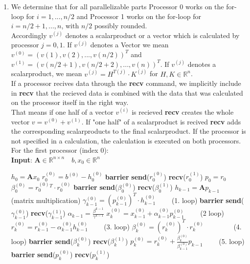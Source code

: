 \documentclass{article}
\begin{document}
\begin{enumerate}[label=(\alph*)]
\item
We determine that for all parallelizable parts Processor 0 works on the for-loop for $i = 1,...,n/2$ and Processor 1 works on the for-loop for $i = n/2+1,...,n$, with $n/2$ possibly rounded.\\
Accordingly $v^{(j)}$ denotes a scalarproduct or a vector which is calculated by processor $j = 0, 1$. 
If $v^{(j)}$ denotes a Vector we mean $v^{(0)} = (v(1), v(2), ..., v(n/2))^T$ and $v^{(1)} = (v(n/2+1), v(n/2+2), ..., v(n))^T$.
If $v^{(j)}$ denotes a scalarproduct, we mean $v^{(j)} = H^{T(j)} \cdot K^{(j)}$ for $H, K \in \mathbb{R}^n$.\\
If a processor recives data through the \textbf{recv} command, we implicitly include in \textbf{recv} that the recieved data is combined with the data that was calculated on the processor itself in the right way. \\
That means if one half of a vector $v^{(i)}$ is recieved \textbf{recv} creates the whole vector $v=v^{(0)}+v^{(1)}$. If "one half" of a scalarproduct is recived \textbf{recv} adds the corresponding scalarproducts to the final scalarproduct.
If the processor is not specified in a calculation, the calculation is executed on both processors.
\\
For the first processor (index 0):
\\
   \textbf{Input}: $ \textbf{A} \in \mathbb{R}^{n\times n} \quad b, x_0\in \mathbb{R}^n$
    \begin{algorithmic}[1]
	\State $h_{0} = \textbf{A}x_{0}$ 
	\State $r^{(0)}_0 = b^{(0)} - h_0^{(0)}$
	\State \textbf{barrier}
	\State \textbf{send}($r_0^{(0)}$)
	\State \textbf{recv}($r_0^{(1)}$)
	\State $p_0 = r_0$
	\State $\beta_0^{(0)} = r^{(0)}_0^T\cdot r^{(0)}_0$
		\State \textbf{barrier}
	\State \textbf{send}($\beta_0^{(0)}$)
	\State \textbf{recv}($\beta_0^{(1)}$)
	\State $h_{k-1} = \textbf{A}p_{k-1}\qquad$ (matrix multiplication)
	\State $\gamma^{(0)}_{k-1} = (p^{(0)}_{k-1})^T\cdot h^{(0)}_{k-1}\qquad$ (1. loop)
			\State \textbf{barrier}
	\State \textbf{send}($\gamma_{k-1}^{(0)}$)
	\State \textbf{recv}($\gamma_{k-1}^{(1)}$)
	\State $\alpha_{k-1} = \frac{\beta^{k-1}}{\gamma^{k-1}}$
	\State $x^{(0)}_k = x^{(0)}_{k-1} + \alpha^{(0)}_{k-1}p^{(0)}_{k-1}\qquad$ (2 loop)
	\State $r^{(0)}_k = r^{(0)}_{k-1} - \alpha^{(0)}_{k-1}h^{(0)}_{k-1}\qquad$ (3. loop)
	\State $\beta^{(0)}_k = (r^{(0)}_k)^T\cdot r^{(0)}_k\qquad \qquad $ (4. loop)
				\State \textbf{barrier}
	\State \textbf{send}($\beta_k^{(0)}$)
	\State \textbf{recv}($\beta_k^{(1)}$)
	\State $p^{(0)}_k = r^{(0)}_{k} + \frac{\beta^{(0)}_k}{\beta^{(0)}_{k-1}}p_{k-1}\qquad$ (5. loop)
					\State \textbf{barrier}
	\State \textbf{send}($p_k^{(0)}$)
	\State \textbf{recv}($p_k^{(1)}$)
	\EndFor
    \end{algorithmic}


\end{enumerate}
\end{document}

